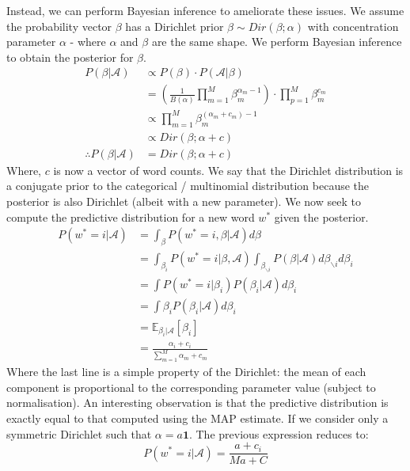 \documentclass[]{article}
\newcommand{\Acal}{\mathcal{A}}
\newcommand{\Expect}{\mathbb{E}}
\begin{document}
Instead, we can perform Bayesian inference to ameliorate these issues. We assume the probability vector $\beta$ has a Dirichlet prior $\beta \sim Dir(\beta ; \alpha)$ with concentration parameter $\alpha$ - where $\alpha$ and $\beta$ are the same shape. We perform Bayesian inference to obtain the posterior for $\beta$.
%
\begin{align}
	P(\beta | \Acal) &\propto P(\beta) \cdot P(\Acal | \beta) \nonumber \\
	&= \left( \frac{1}{B(\alpha)} \prod_{m = 1}^{M} \beta_m^{\alpha_m -1} \right) \cdot \prod_{p=1}^{M} \beta_m^{c_m} \nonumber \\
	&\propto \prod_{m = 1}^{M} \beta_m^{(\alpha_m + c_m) -1} \nonumber \\
	&\propto Dir(\beta ; \alpha + c) \nonumber \\
	\therefore P(\beta | \Acal) &= Dir(\beta ; \alpha + c)
	\label{eqn:posterior}
\end{align}
%
Where, $c$ is now a vector of word counts. We say that the Dirichlet distribution is a conjugate prior to the categorical / multinomial distribution because the posterior is also Dirichlet (albeit with a new parameter). We now seek to compute the predictive distribution for a new word $w^*$ given the posterior.
%
\begin{align*}
	P(w^* = i | \Acal) &= \int_{\beta} P(w^* = i, \beta | \Acal) d\beta \\
	&= \int_{\beta_i} P(w^* = i | \beta , \Acal) \int_{\beta_{\backslash i}} P(\beta | \Acal) d\beta_{\backslash i} d\beta_i \\
	&= \int P(w^* = i | \beta_i) P(\beta_i | \Acal) d\beta_i \\
	&= \int \beta_i P(\beta_i | \Acal) d\beta_i \\
	&= \Expect_{\beta_i | \Acal} [\beta_i] \\
	&= \frac{\alpha_i + c_i}{\sum_{m=1}^{M} \alpha_m + c_m}
\end{align*}
%
Where the last line is a simple property of the Dirichlet: the mean of each component is proportional to the corresponding parameter value (subject to normalisation). An interesting observation is that the predictive distribution is exactly equal to that computed using the MAP estimate. If we consider only a symmetric Dirichlet such that $\alpha = a \mathbf{1}$. The previous expression reduces to:
%
\begin{equation}
	P(w^* = i | \Acal) = \frac{a + c_i}{Ma + C}
	\label{eqn:pred-bayes}
\end{equation}
\end{document}

